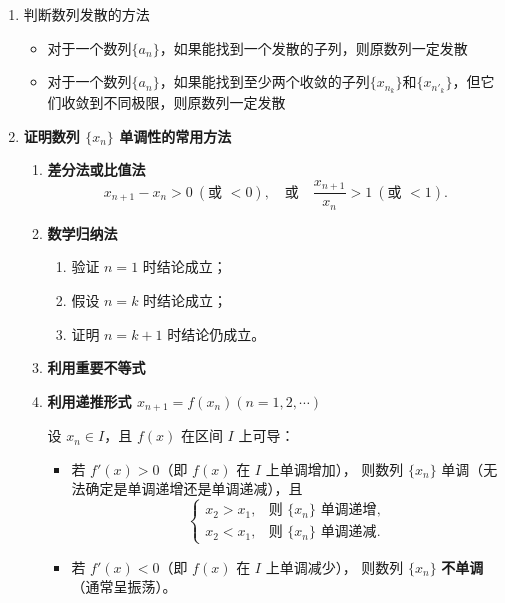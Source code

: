 \documentclass[a4paper,12pt]{article}
\begin{document}
    \begin{enumerate}
        \item 判断数列发散的方法
        \begin{itemize}
            \item 对于一个数列$\{a_n\}$，如果能找到一个发散的子列，则原数列一定发散
            \item 对于一个数列$\{a_n\}$，如果能找到至少两个收敛的子列$\{x_{n_k}\}$和$\{x_{n'_k}\}$，但它们收敛到不同极限，则原数列一定发散
        \end{itemize}
        \item \textbf{证明数列 $\{x_n\}$ 单调性的常用方法}
        \begin{enumerate}[label=\alph*.]
            \item \textbf{差分法或比值法}
            \[
                x_{n+1}-x_n > 0 \ (\text{或 } < 0),
                \quad \text{或} \quad
                \frac{x_{n+1}}{x_n} > 1 \ (\text{或 } < 1).
            \]

            \item \textbf{数学归纳法}
            \begin{enumerate}
                \item 验证 $n=1$ 时结论成立；
                \item 假设 $n=k$ 时结论成立；
                \item 证明 $n=k+1$ 时结论仍成立。
            \end{enumerate}

            \item \textbf{利用重要不等式}

            \item \textbf{利用递推形式 $x_{n+1}=f(x_n)(n = 1, 2, \cdots)$}

            设 $x_n \in I$，且 $f(x)$ 在区间 $I$ 上可导：
            \begin{itemize}
                \item 若 $f'(x) > 0$（即 $f(x)$ 在 $I$ 上单调增加），
                则数列 $\{x_n\}$ 单调（无法确定是单调递增还是单调递减），且
                \[
                    \begin{cases}
                        x_2 > x_1, & \text{则 } \{x_n\} \text{ 单调递增}, \\[2mm]
                        x_2 < x_1, & \text{则 } \{x_n\} \text{ 单调递减}.
                    \end{cases}
                \]
                \item 若 $f'(x) < 0$（即 $f(x)$ 在 $I$ 上单调减少），
                则数列 $\{x_n\}$ \textbf{不单调}（通常呈振荡）。
            \end{itemize}
        \end{enumerate}
    \end{enumerate}
\end{document}
